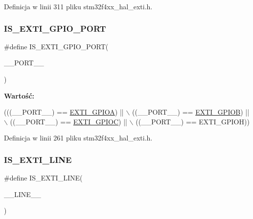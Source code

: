 Definicja w linii 311 pliku stm32f4xx\+\_\+hal\+\_\+exti.\+h.

\mbox{\label{group___e_x_t_i___private___macros_ga839c895e37f0e74052194d91ad68a3ae}} 
\subsubsection{\texorpdfstring{I\+S\+\_\+\+E\+X\+T\+I\+\_\+\+G\+P\+I\+O\+\_\+\+P\+O\+RT}{IS\_EXTI\_GPIO\_PORT}}
{\footnotesize\ttfamily \#define I\+S\+\_\+\+E\+X\+T\+I\+\_\+\+G\+P\+I\+O\+\_\+\+P\+O\+RT(\begin{DoxyParamCaption}\item[{}]{\+\_\+\+\_\+\+P\+O\+R\+T\+\_\+\+\_\+ }\end{DoxyParamCaption})}

{\bfseries Wartość\+:}
\begin{DoxyCode}
(((\_\_PORT\_\_) == \hyperlink{group___e_x_t_i___g_p_i_o_sel_ga562f178c10011ea8de3721d400176558}{EXTI\_GPIOA}) || \(\backslash\)
                                         ((\_\_PORT\_\_) == \hyperlink{group___e_x_t_i___g_p_i_o_sel_ga226a2e7987e1e808eff168985d378641}{EXTI\_GPIOB}) || \(\backslash\)
                                         ((\_\_PORT\_\_) == \hyperlink{group___e_x_t_i___g_p_i_o_sel_gaa74b8f490a793f237c6a55f56ba6e644}{EXTI\_GPIOC}) || \(\backslash\)
                                         ((\_\_PORT\_\_) == EXTI\_GPIOH))
\end{DoxyCode}


Definicja w linii 261 pliku stm32f4xx\+\_\+hal\+\_\+exti.\+h.

\mbox{\label{group___e_x_t_i___private___macros_gab9eb047b8a317ec5f38c9bfcca65744c}} 
\subsubsection{\texorpdfstring{I\+S\+\_\+\+E\+X\+T\+I\+\_\+\+L\+I\+NE}{IS\_EXTI\_LINE}}
{\footnotesize\ttfamily \#define I\+S\+\_\+\+E\+X\+T\+I\+\_\+\+L\+I\+NE(\begin{DoxyParamCaption}\item[{}]{\+\_\+\+\_\+\+L\+I\+N\+E\+\_\+\+\_\+ }\end{DoxyParamCaption})}

